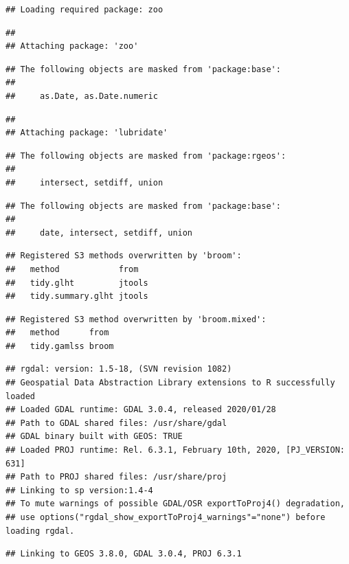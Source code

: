 \documentclass[
]{book}
\begin{document}
\begin{verbatim}
## Loading required package: zoo
\end{verbatim}

\begin{verbatim}
## 
## Attaching package: 'zoo'
\end{verbatim}

\begin{verbatim}
## The following objects are masked from 'package:base':
## 
##     as.Date, as.Date.numeric
\end{verbatim}

\begin{verbatim}
## 
## Attaching package: 'lubridate'
\end{verbatim}

\begin{verbatim}
## The following objects are masked from 'package:rgeos':
## 
##     intersect, setdiff, union
\end{verbatim}

\begin{verbatim}
## The following objects are masked from 'package:base':
## 
##     date, intersect, setdiff, union
\end{verbatim}

\begin{verbatim}
## Registered S3 methods overwritten by 'broom':
##   method            from  
##   tidy.glht         jtools
##   tidy.summary.glht jtools
\end{verbatim}

\begin{verbatim}
## Registered S3 method overwritten by 'broom.mixed':
##   method      from 
##   tidy.gamlss broom
\end{verbatim}

\begin{verbatim}
## rgdal: version: 1.5-18, (SVN revision 1082)
## Geospatial Data Abstraction Library extensions to R successfully loaded
## Loaded GDAL runtime: GDAL 3.0.4, released 2020/01/28
## Path to GDAL shared files: /usr/share/gdal
## GDAL binary built with GEOS: TRUE 
## Loaded PROJ runtime: Rel. 6.3.1, February 10th, 2020, [PJ_VERSION: 631]
## Path to PROJ shared files: /usr/share/proj
## Linking to sp version:1.4-4
## To mute warnings of possible GDAL/OSR exportToProj4() degradation,
## use options("rgdal_show_exportToProj4_warnings"="none") before loading rgdal.
\end{verbatim}

\begin{verbatim}
## Linking to GEOS 3.8.0, GDAL 3.0.4, PROJ 6.3.1
\end{verbatim}
\end{document}
